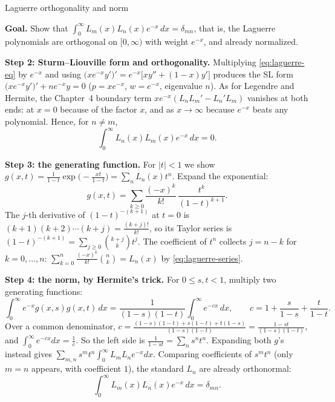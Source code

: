 \documentclass[11pt]{beamer}
\begin{document}
\begin{frame}[allowframebreaks=1.00]{Laguerre orthogonality and norm}
\footnotesize

\textbf{Goal.} Show that $\int_0^\infty L_m(x)L_n(x)e^{-x}\,dx=\delta_{mn}$, that is, the
Laguerre polynomials are orthogonal on $[0,\infty)$ with weight $e^{-x}$, and already normalized.

\textbf{Step 2: Sturm--Liouville form and orthogonality.}
Multiplying \eqref{eq:laguerre-eq} by $e^{-x}$ and using
$\bigl(xe^{-x}y'\bigr)'=e^{-x}\bigl[xy''+(1-x)y'\bigr]$ produces the SL form
$\bigl(xe^{-x}y'\bigr)'+ne^{-x}y=0$ ($p=xe^{-x}$, $w=e^{-x}$, eigenvalue $n$).
As for Legendre and Hermite, the Chapter~4 boundary term
$xe^{-x}(L_nL_m'-L_n'L_m)$ vanishes at both ends: at $x=0$ because of the factor $x$,
and as $x\to\infty$ because $e^{-x}$ beats any polynomial. Hence, for $n\ne m$,
\begin{equation}
  \int_0^{\infty}L_n(x)L_m(x)e^{-x}\,dx=0.
  \label{eq:laguerre-ortho}
\end{equation}

\textbf{Step 3: the generating function.} For \(|t|<1\) we show
\(g(x,t)=\frac1{1-t}\exp\bigl(-\frac{xt}{1-t}\bigr)=\sum_nL_n(x)t^n\). Expand the exponential:
\[
 g(x,t)=\sum_{k\ge0}\frac{(-x)^k}{k!}\,\frac{t^k}{(1-t)^{k+1}} .
\]
The \(j\)-th derivative of \((1-t)^{-(k+1)}\) at \(t=0\) is \((k+1)(k+2)\cdots(k+j)=\frac{(k+j)!}{k!}\), so its Taylor series is
\((1-t)^{-(k+1)}=\sum_{j\ge0}\binom{k+j}{k}t^j\). The coefficient of \(t^n\) collects \(j=n-k\) for \(k=0,\dots,n\):
\(\sum_{k=0}^{n}\frac{(-x)^k}{k!}\binom nk=L_n(x)\) by \eqref{eq:laguerre-series}.
\par\framebreak\par
\textbf{Step 4: the norm, by Hermite's trick.} For \(0\le s,t<1\), multiply two generating functions:
\[
 \int_0^\infty e^{-x}g(x,s)g(x,t)\,dx=\frac{1}{(1-s)(1-t)}\int_0^\infty e^{-cx}\,dx,\qquad
 c=1+\frac{s}{1-s}+\frac{t}{1-t}.
\]
Over a common denominator, \(c=\frac{(1-s)(1-t)+s(1-t)+t(1-s)}{(1-s)(1-t)}=\frac{1-st}{(1-s)(1-t)}\), and \(\int_0^\infty e^{-cx}dx=\frac1c\).
So the left side is \(\frac{1}{1-st}=\sum_n s^nt^n\). Expanding both \(g\)'s instead gives
\(\sum_{m,n}s^mt^n\int_0^\infty L_mL_ne^{-x}dx\). Comparing coefficients of \(s^mt^n\) (only \(m=n\) appears, with
coefficient \(1\)), the standard \(L_n\) are already orthonormal:
\begin{equation}
  \int_{0}^{\infty}L_m(x)L_n(x)e^{-x}\,dx=\delta_{mn}.
  \label{eq:laguerre-norm}
\end{equation}
\end{frame}
\end{document}
